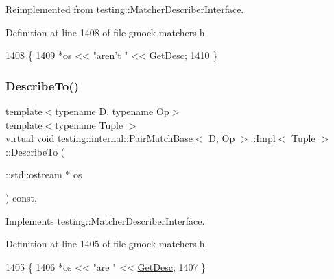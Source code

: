 Reimplemented from \hyperlink{classtesting_1_1MatcherDescriberInterface_a2071afbc47097c4d1c0064275af34db0}{testing\+::\+Matcher\+Describer\+Interface}.



Definition at line 1408 of file gmock-\/matchers.\+h.


\begin{DoxyCode}
1408                                                           \{
1409       *os << \textcolor{stringliteral}{"aren't "} << \hyperlink{classtesting_1_1internal_1_1PairMatchBase_afbc320d92000f77ec1ba276c26ec1a72}{GetDesc};
1410     \}
\end{DoxyCode}
\mbox{\label{classtesting_1_1internal_1_1PairMatchBase_1_1Impl_a15875cb34c31a19a8decad64899fff3f}} 
\subsubsection{\texorpdfstring{Describe\+To()}{DescribeTo()}}
{\footnotesize\ttfamily template$<$typename D, typename Op$>$ \\
template$<$typename Tuple $>$ \\
virtual void \hyperlink{classtesting_1_1internal_1_1PairMatchBase}{testing\+::internal\+::\+Pair\+Match\+Base}$<$ D, Op $>$\+::\hyperlink{classtesting_1_1internal_1_1PairMatchBase_1_1Impl}{Impl}$<$ Tuple $>$\+::Describe\+To (\begin{DoxyParamCaption}\item[{\+::std\+::ostream $\ast$}]{os }\end{DoxyParamCaption}) const\hspace{0.3cm}{\ttfamily [inline]}, {\ttfamily [virtual]}}



Implements \hyperlink{classtesting_1_1MatcherDescriberInterface_ad9f861588bd969b6e3e717f13bb94e7b}{testing\+::\+Matcher\+Describer\+Interface}.



Definition at line 1405 of file gmock-\/matchers.\+h.


\begin{DoxyCode}
1405                                                   \{
1406       *os << \textcolor{stringliteral}{"are "} << \hyperlink{classtesting_1_1internal_1_1PairMatchBase_afbc320d92000f77ec1ba276c26ec1a72}{GetDesc};
1407     \}
\end{DoxyCode}
\mbox{\label{classtesting_1_1internal_1_1PairMatchBase_1_1Impl_abba39c0ceaf795ded3845af76af8772f}} 
